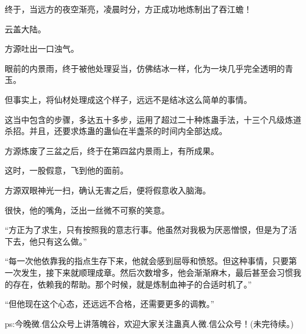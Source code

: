 \begin{this_body}
终于，当远方的夜空渐亮，凌晨时分，方正成功地炼制出了吞江蟾！

云盖大陆。

方源吐出一口浊气。

眼前的内景雨，终于被他处理妥当，仿佛结冰一样，化为一块几乎完全透明的青玉。

但事实上，将仙材处理成这个样子，远远不是结冰这么简单的事情。

这当中包含的步骤，多达五十多步，运用了超过二十种炼蛊手法，十三个凡级炼道杀招。并且，还要求炼蛊的蛊仙在半盏茶的时间内全部达成。

方源炼废了三盆之后，终于在第四盆内景雨上，有所成果。

这时，一股假意，飞到他的面前。

方源双眼神光一扫，确认无害之后，便将假意收入脑海。

很快，他的嘴角，泛出一丝微不可察的笑意。

“方正为了求生，只有按照我的意志行事。他虽然对我极为厌恶憎恨，但是为了活下去，他只有这么做。”

“每一次他依靠我的指点生存下来，他就会感到屈辱和愤怒。但这种事情，只要第一次发生，接下来就顺理成章。然后次数增多，他会渐渐麻木，最后甚至会习惯我的存在，依赖我的帮助。那个时候，就是炼制血神子的合适时机了。”

“但他现在这个心态，还远远不合格，还需要更多的调教。”

ps:今晚微.信公众号上讲落魄谷，欢迎大家关注蛊真人微.信公众号！(未完待续。)

\end{this_body}

